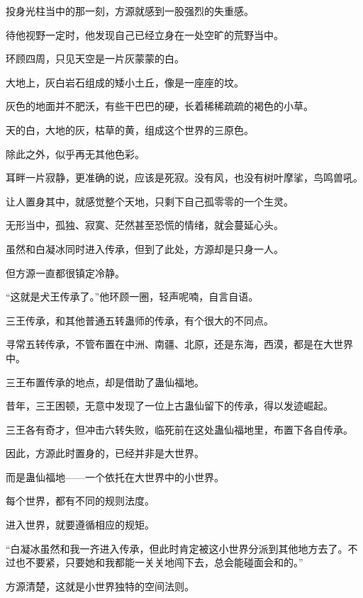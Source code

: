 
\begin{this_body}



投身光柱当中的那一刻，方源就感到一股强烈的失重感。

待他视野一定时，他发现自己已经立身在一处空旷的荒野当中。

环顾四周，只见天空是一片灰蒙蒙的白。

大地上，灰白岩石组成的矮小土丘，像是一座座的坟。

灰色的地面并不肥沃，有些干巴巴的硬，长着稀稀疏疏的褐色的小草。

天的白，大地的灰，枯草的黄，组成这个世界的三原色。

除此之外，似乎再无其他色彩。

耳畔一片寂静，更准确的说，应该是死寂。没有风，也没有树叶摩挲，鸟鸣兽吼。

让人置身其中，就感觉整个天地，只剩下自己孤零零的一个生灵。

无形当中，孤独、寂寞、茫然甚至恐慌的情绪，就会蔓延心头。

虽然和白凝冰同时进入传承，但到了此处，方源却是只身一人。

但方源一直都很镇定冷静。

“这就是犬王传承了。”他环顾一圈，轻声呢喃，自言自语。

三王传承，和其他普通五转蛊师的传承，有个很大的不同点。

寻常五转传承，不管布置在中洲、南疆、北原，还是东海，西漠，都是在大世界中。

三王布置传承的地点，却是借助了蛊仙福地。

昔年，三王困顿，无意中发现了一位上古蛊仙留下的传承，得以发迹崛起。

三王各有奇才，但冲击六转失败，临死前在这处蛊仙福地里，布置下各自传承。

因此，方源此时置身的，已经并非是大世界。

而是蛊仙福地——一个依托在大世界中的小世界。

每个世界，都有不同的规则法度。

进入世界，就要遵循相应的规矩。

“白凝冰虽然和我一齐进入传承，但此时肯定被这小世界分派到其他地方去了。不过也不要紧，只要她和我都能一关关地闯下去，总会能碰面会和的。”

方源清楚，这就是小世界独特的空间法则。


\end{this_body}
